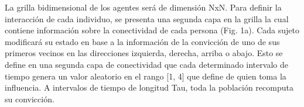 La grilla bidimensional de los agentes será de dimensión NxN. Para definir la interacción de cada individuo, se presenta una segunda capa en la grilla la cual contiene información sobre la conectividad de cada persona (Fig. 1a). Cada sujeto modificará su estado en base a la información de la convicción de uno de sus primeros vecinos en las direcciones izquierda, derecha, arriba o abajo. Esto se define en una segunda capa de conectividad que cada determinado intervalo de tiempo genera un valor aleatorio en el rango [1, 4] que define de quien toma la influencia. A intervalos de tiempo de longitud Tau, toda la población recomputa su convicción.


